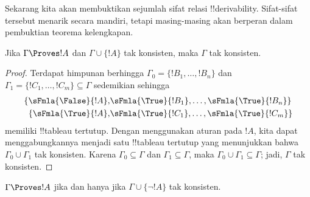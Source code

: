 \documentclass[../../../include/open-logic-section]{subfiles}
\begin{document}
      {}
      {}


Sekarang kita akan membuktikan sejumlah sifat relasi !!{derivability}.
Sifat-sifat tersebut menarik secara mandiri, tetapi masing-masing akan
berperan dalam pembuktian teorema kelengkapan.

\begin{prop}
  Jika $\Gamma \Proves !A$ dan $\Gamma \cup \{!A\}$ tak konsisten,
  maka $\Gamma$ tak konsisten.
\end{prop}

\begin{proof}
Terdapat himpunan berhingga $\Gamma_0 = \{!B_1, \dots, !B_n\}$ dan
$\Gamma_1 =\{!C_1, \dots, !C_m\} \subseteq \Gamma$ sedemikian sehingga
  \begin{align*}
    \{\sFmla{\False}{!A}, &
    \sFmla{\True}{!B_1}, \dots, \sFmla{\True}{!B_n}\} \\
    \{\sFmla{\True}{!A}, &
    \sFmla{\True}{!C_1}, \dots, \sFmla{\True}{!C_m}\}
  \end{align*}
  memiliki !!{tableau} tertutup. Dengan menggunakan aturan \Cut{} pada
  $!A$, kita dapat menggabungkannya menjadi satu !!{tableau} tertutup
  yang menunjukkan bahwa $\Gamma_0 \cup \Gamma_1$ tak konsisten. Karena
  $\Gamma_0 \subseteq \Gamma$ dan $\Gamma_1 \subseteq \Gamma$, maka
  $\Gamma_0 \cup \Gamma_1 \subseteq \Gamma$; jadi, $\Gamma$ tak
  konsisten.
\end{proof}

\begin{prop}
$\Gamma \Proves !A$ jika dan hanya jika $\Gamma \cup \{\lnot !A\}$
tak konsisten.
\end{prop}
\end{document}
